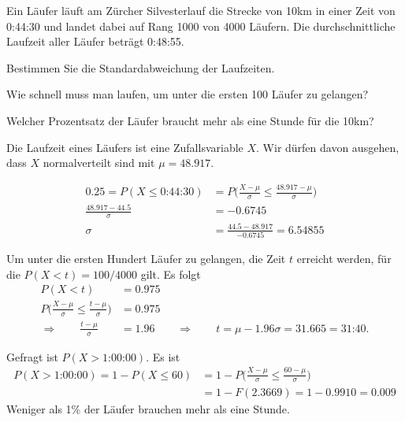 Ein Läufer läuft am Zürcher Silvesterlauf die Strecke von 10km in
einer Zeit von 0:44:30 und landet dabei auf Rang 1000 von 4000 Läufern.
Die durchschnittliche Laufzeit aller Läufer beträgt 0:48:55.
\begin{teilaufgaben}
\item 
Bestimmen Sie die Standardabweichung der Laufzeiten.
\item
Wie schnell muss man laufen, um unter die ersten 100 Läufer zu gelangen?
\item
Welcher Prozentsatz der Läufer braucht mehr als eine Stunde für die 10km?
\end{teilaufgaben}

\begin{loesung}
Die Laufzeit eines Läufers ist eine Zufallsvariable $X$.
Wir dürfen davon ausgehen, dass $X$ normalverteilt sind mit $\mu=48.917$.
\begin{teilaufgaben}
\item 
\begin{align*}
0.25
=
P(X \le \text{0:44:30})
&=
P\biggl(
\frac{X-\mu}{\sigma} \le \frac{48.917 - \mu}{\sigma}
\biggr)
\\
\frac{48.917 - 44.5}{\sigma}
&=
-0.6745
\\
\sigma
&=
\frac{44.5- 48.917}{-0.6745}
=
6.54855
\end{align*}
\item 
Um unter die ersten Hundert Läufer zu gelangen, die Zeit $t$ erreicht werden,
für die $P(X<t)=100/4000$ gilt.
Es folgt
\begin{align*}
P(X<t)
&=
0.975
\\
P\biggl(\frac{X-\mu}{\sigma}\le\frac{t-\mu}{\sigma}\biggr)
&=
0.975
\\
\Rightarrow\qquad
\frac{t-\mu}{\sigma}
&=
1.96
\qquad\Rightarrow\qquad
t=\mu - 1.96\sigma = 31.665 = \text{31:40}.
\end{align*}
\item
Gefragt ist $P(X>\text{1:00:00})$.
Es ist
\begin{align*}
P(X>\text{1:00:00})
=1-P(X\le 60)
&=
1- P\biggl(\frac{X-\mu}{\sigma} \le \frac{60-\mu}{\sigma}\biggr)
\\
&=
1 - F(2.3669)
=
1-0.9910=0.009
\end{align*}
Weniger als 1\% der Läufer brauchen mehr als eine Stunde.
\qedhere
\end{teilaufgaben}
\end{loesung}




